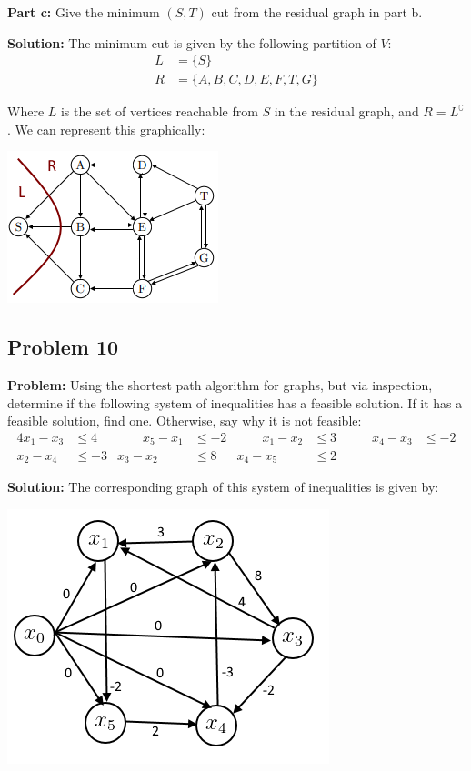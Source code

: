 \documentclass{article}
\begin{document}
\noindent\textbf{Part c:} Give the minimum $(S,T)$ cut from the residual graph in part b.
\bigskip

\noindent\textbf{Solution:} The minimum cut is given by the following partition of $V$:
\begin{align*}
  L&=\{S\}\\
  R&=\{A,B,C,D,E,F,T,G\}
\end{align*}

Where $L$ is the set of vertices reachable from $S$ in the residual graph, and $R=L^\complement$. We can represent this graphically:
\begin{center}
  \includegraphics{graph9c.png}
\end{center}

\subsection*{Problem 10}
\noindent\textbf{Problem:} Using the shortest path algorithm for graphs, but via inspection, determine if the following system of inequalities has a feasible solution. If it has a feasible solution, find one. Otherwise, say why it is not feasible:
\begin{alignat*}{4}
  x_1-x_3&\le4  &\qquad  x_5-x_1&\le-2  &\qquad  x_1-x_2&\le3 &\qquad x_4-x_3&\le-2\\
  x_2-x_4&\le-3  &  x_3-x_2&\le8 &  x_4-x_5&\le2
\end{alignat*}

\noindent\textbf{Solution:} The corresponding graph of this system of inequalities is given by:
\begin{center}
  \includegraphics{graph10.png}
\end{center}
\end{document}
